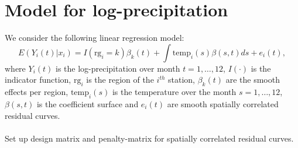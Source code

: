 \documentclass{article}\usepackage[]{graphicx}\usepackage[]{color}
\begin{document}
\clearpage


\section{Model for log-precipitation}

We consider the following linear regression model:
\[
 E(Y_i(t)|x_i )= I(\mbox{rg}_i=k) \beta_k(t) + \int{\mbox{temp}}_i(s)\beta(s,t)ds + e_i(t),
\]
where $Y_i(t)$ is the log-precipitation over month $t=1, \ldots, 12$, $I(\cdot)$ is the indicator function, $\mbox{rg}_i$ is the region of the $i^{th}$ station, $\beta_k(t)$ are the smooth effects per region, $\mbox{temp}_i (s)$ is the temperature over the month  $s=1, \ldots, 12$, $\beta(s,t)$ is the coefficient surface and $e_i(t)$ are smooth spatially correlated residual curves.
\\\\
Set up design matrix and penalty-matrix for spatially correlated residual curves. 
\end{document}

